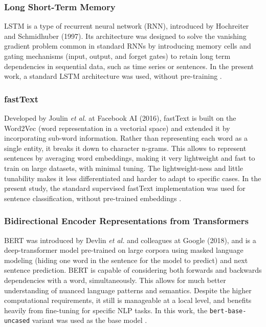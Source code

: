 \documentclass[conference]{IEEEtran}
\begin{document}
\subsubsection{Long Short-Term Memory}

LSTM is a type of recurrent neural network (RNN), introduced by Hochreiter and Schmidhuber (1997). Its architecture was designed to solve the vanishing gradient problem common in standard RNNs by introducing memory cells and gating mechanisms (input, output, and forget gates) to retain long term dependencies in sequential data, such as time series or sentences. In the present work, a standard LSTM architecture was used, without pre-training \cite{hochreiter1997long}.

\subsubsection{fastText}

Developed by Joulin \textit{et al.} at Facebook AI (2016), fastText is built on the Word2Vec (word representation in a vectorial space) and extended it by incorporating sub-word information. Rather than representing each word as a single entity, it breaks it down to character n-grams. This allows to represent sentences by averaging word embeddings, making it very lightweight and fast to train on large datasets, with minimal tuning. The lightweight-ness and little tunability makes it less differentiated and harder to adapt to specific cases. In the present study, the standard supervised fastText implementation was used for sentence classification, without pre-trained embeddings \cite{joulin2017bag}.

\subsubsection{Bidirectional Encoder Representations from Transformers}

BERT was introduced by Devlin \textit{et al.} and colleagues at Google (2018), and is a deep-transformer model pre-trained on large corpora using masked language modeling (hiding one word in the sentence for the model to predict) and next sentence prediction. BERT is capable of considering both forwards and backwards dependencies with a word, simultaneously. This allows for much better understanding of nuanced language patterns and semantics. Despite the higher computational requirements, it still is manageable at a local level, and benefits heavily from fine-tuning for specific NLP tasks. In this work, the \texttt{bert-base-uncased} variant was used as the base model \cite{devlin2019bert}.
\end{document}
